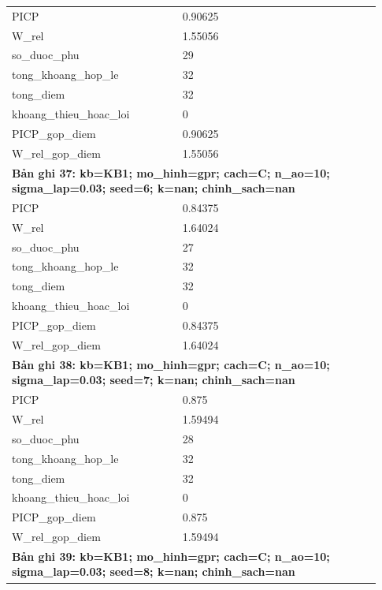 \begin{longtable}{p{0.43\linewidth}p{0.50\linewidth}}
PICP & 0.90625 \\
W\_\allowbreak rel & 1.55056 \\
so\_\allowbreak duoc\_\allowbreak phu & 29 \\
tong\_\allowbreak khoang\_\allowbreak hop\_\allowbreak le & 32 \\
tong\_\allowbreak diem & 32 \\
khoang\_\allowbreak thieu\_\allowbreak hoac\_\allowbreak loi & 0 \\
PICP\_\allowbreak gop\_\allowbreak diem & 0.90625 \\
W\_\allowbreak rel\_\allowbreak gop\_\allowbreak diem & 1.55056 \\
\midrule
\multicolumn{2}{p{0.95\linewidth}}{\textbf{Bản ghi 37: kb=KB1; mo\_hinh=gpr; cach=C; n\_ao=10; sigma\_lap=0.03; seed=6; k=nan; chinh\_sach=nan}} \\
PICP & 0.84375 \\
W\_\allowbreak rel & 1.64024 \\
so\_\allowbreak duoc\_\allowbreak phu & 27 \\
tong\_\allowbreak khoang\_\allowbreak hop\_\allowbreak le & 32 \\
tong\_\allowbreak diem & 32 \\
khoang\_\allowbreak thieu\_\allowbreak hoac\_\allowbreak loi & 0 \\
PICP\_\allowbreak gop\_\allowbreak diem & 0.84375 \\
W\_\allowbreak rel\_\allowbreak gop\_\allowbreak diem & 1.64024 \\
\midrule
\multicolumn{2}{p{0.95\linewidth}}{\textbf{Bản ghi 38: kb=KB1; mo\_hinh=gpr; cach=C; n\_ao=10; sigma\_lap=0.03; seed=7; k=nan; chinh\_sach=nan}} \\
PICP & 0.875 \\
W\_\allowbreak rel & 1.59494 \\
so\_\allowbreak duoc\_\allowbreak phu & 28 \\
tong\_\allowbreak khoang\_\allowbreak hop\_\allowbreak le & 32 \\
tong\_\allowbreak diem & 32 \\
khoang\_\allowbreak thieu\_\allowbreak hoac\_\allowbreak loi & 0 \\
PICP\_\allowbreak gop\_\allowbreak diem & 0.875 \\
W\_\allowbreak rel\_\allowbreak gop\_\allowbreak diem & 1.59494 \\
\midrule
\multicolumn{2}{p{0.95\linewidth}}{\textbf{Bản ghi 39: kb=KB1; mo\_hinh=gpr; cach=C; n\_ao=10; sigma\_lap=0.03; seed=8; k=nan; chinh\_sach=nan}} \\

\end{longtable}
